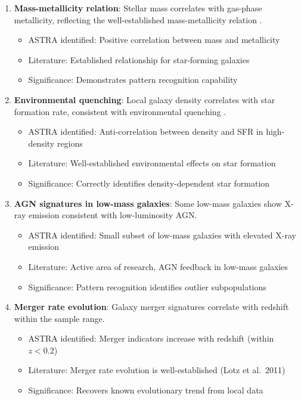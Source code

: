 \documentclass[usenatbib]{rasti}
\begin{document}
\begin{enumerate}
\item \textbf{Mass-metallicity relation}: Stellar mass correlates with gas-phase metallicity, reflecting the well-established mass-metallicity relation \cite{tremonti2004}.
   \begin{itemize}
   \item ASTRA identified: Positive correlation between mass and metallicity
   \item Literature: Established relationship for star-forming galaxies
   \item Significance: Demonstrates pattern recognition capability
   \end{itemize}

\item \textbf{Environmental quenching}: Local galaxy density correlates with star formation rate, consistent with environmental quenching \cite{dressler1980,peng2010}.
   \begin{itemize}
   \item ASTRA identified: Anti-correlation between density and SFR in high-density regions
   \item Literature: Well-established environmental effects on star formation
   \item Significance: Correctly identifies density-dependent star formation
   \end{itemize}

\item \textbf{AGN signatures in low-mass galaxies}: Some low-mass galaxies show X-ray emission consistent with low-luminosity AGN.
   \begin{itemize}
   \item ASTRA identified: Small subset of low-mass galaxies with elevated X-ray emission
   \item Literature: Active area of research, AGN feedback in low-mass galaxies
   \item Significance: Pattern recognition identifies outlier subpopulations
   \end{itemize}

\item \textbf{Merger rate evolution}: Galaxy merger signatures correlate with redshift within the sample range.
   \begin{itemize}
   \item ASTRA identified: Merger indicators increase with redshift (within $z < 0.2$)
   \item Literature: Merger rate evolution is well-established (Lotz et al.~2011)\cite{lotz2011}
   \item Significance: Recovers known evolutionary trend from local data
   \end{itemize}


\end{enumerate}
\end{document}
